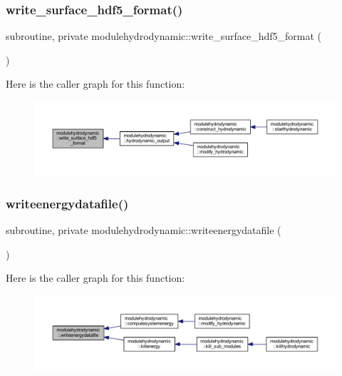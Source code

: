 \subsubsection{\texorpdfstring{write\+\_\+surface\+\_\+hdf5\+\_\+format()}{write\_surface\_hdf5\_format()}}
{\footnotesize\ttfamily subroutine, private modulehydrodynamic\+::write\+\_\+surface\+\_\+hdf5\+\_\+format (\begin{DoxyParamCaption}{ }\end{DoxyParamCaption})\hspace{0.3cm}{\ttfamily [private]}}

Here is the caller graph for this function\+:\nopagebreak
\begin{figure}[H]
\begin{center}
\leavevmode
\includegraphics[width=350pt]{namespacemodulehydrodynamic_ae031a7cef6170ae4c1b13ffb602108a6_icgraph}
\end{center}
\end{figure}
\mbox{\label{namespacemodulehydrodynamic_a99c46c970a39feb3ece42b919ed01d08}} 
\subsubsection{\texorpdfstring{writeenergydatafile()}{writeenergydatafile()}}
{\footnotesize\ttfamily subroutine, private modulehydrodynamic\+::writeenergydatafile (\begin{DoxyParamCaption}{ }\end{DoxyParamCaption})\hspace{0.3cm}{\ttfamily [private]}}

Here is the caller graph for this function\+:\nopagebreak
\begin{figure}[H]
\begin{center}
\leavevmode
\includegraphics[width=350pt]{namespacemodulehydrodynamic_a99c46c970a39feb3ece42b919ed01d08_icgraph}
\end{center}
\end{figure}


